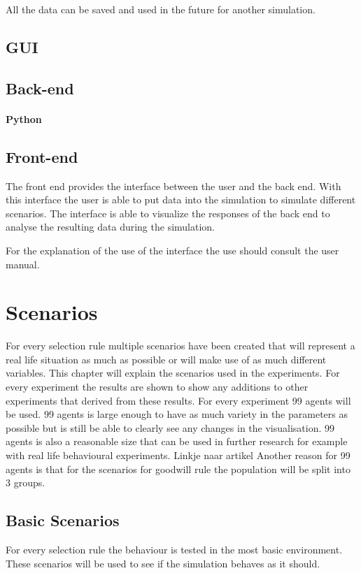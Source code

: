 \documentclass[twoside,openright]{uva-bachelor-thesis}
\begin{document}
All the data can be saved and used in the future for another simulation.

\section{GUI}

\section{Back-end}

\subsubsection{Python}

\section{Front-end}
The front end provides the interface between the user and the back end. With this interface the user is able to put data into the simulation to simulate different scenarios. The interface is able to visualize the responses of the back end to analyse the resulting data during the simulation.

For the explanation of the use of the interface the use should consult the user manual.


\chapter{Scenarios}
For every selection rule multiple scenarios have been created that will represent a real life situation as much as possible or will make use of as much different variables.  This chapter will explain the scenarios used in the experiments. For every experiment the results are shown to show any additions to other experiments that derived from these results.
For every experiment 99 agents will be used. 99 agents is large enough to have as much variety in the parameters as possible but is still be able to clearly see any changes in the visualisation. 99 agents is also a reasonable size that can be used in further research for example with real life behavioural experiments. Linkje naar artikel Another reason for 99 agents is that for the scenarios for goodwill rule the population will be split into 3 groups.

\section{Basic Scenarios}
For every selection rule the behaviour is tested in the most basic environment. These scenarios will be used to see if the simulation behaves as it should.
\end{document}
